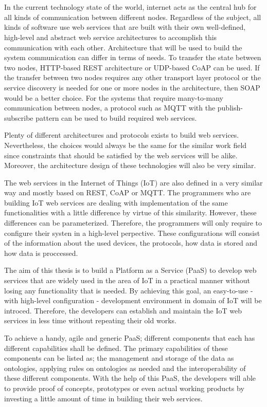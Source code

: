 \chapter{\abstractname}

In the current technology state of the world, internet acts as the central hub for all kinds of communication between different nodes. Regardless of the subject, all kinds of software use web services that are built with their own well-defined, high-level and abstract web service architectures to accomplish this communication with each other. Architecture that will be used to build the system communication can differ in terms of needs. To transfer the state between two nodes, HTTP-based REST architecture or UDP-based CoAP can be used. If the transfer between two nodes requires any other transport layer protocol or the service discovery is needed for one or more nodes in the architecture, then SOAP would be a better choice. For the systems that require many-to-many communication between nodes, a protocol such as MQTT with the publish-subscribe pattern can be used to build required web services.

Plenty of different architectures and protocols exists to build web services. Nevertheless, the choices would always be the same for the similar work field since constraints that should be satisfied by the web services will be alike. Moreover, the architecture design of these technologies will also be very similar.

The web services in the Internet of Things (IoT) are also defined in a very similar way and mostly based on REST, CoAP or MQTT. The programmers who are building IoT web services are dealing with implementation of the same functionalities with a little difference by virtue of this similarity. However, these differences can be parameterized. Therefore, the programmers will only require to configure their systen in a high-level perpective. These configurations will consist of the information about the used devices, the protocols, how data is stored and how data is proccessed.

The aim of this thesis is to build a Platform as a Service (PaaS) to develop web services that are widely used in the area of IoT in a practical manner without losing any functionality that is needed. By achieving this goal, an easy-to-use - with high-level configuration - development environment in domain of IoT will be introced. Therefore, the developers can establish and maintain the IoT web services in less time without repeating their old works. 

To achieve a handy, agile and generic PaaS; different components that each has different capabilities shall be defined. The primary capabilities of these components can be listed as; the management and storage of the data as ontologies, applying rules on ontologies as needed and the interoperability of these different components. With the help of this PaaS, the developers will able to provide proof of concepts, prototypes or even actual working products by investing a little amount of time in building their web services.
